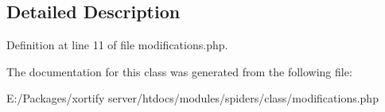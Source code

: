 \subsection{Detailed Description}


Definition at line 11 of file modifications.\-php.



The documentation for this class was generated from the following file\-:\begin{DoxyCompactItemize}
\item 
E\-:/\-Packages/xortify server/htdocs/modules/spiders/class/modifications.\-php\end{DoxyCompactItemize}
